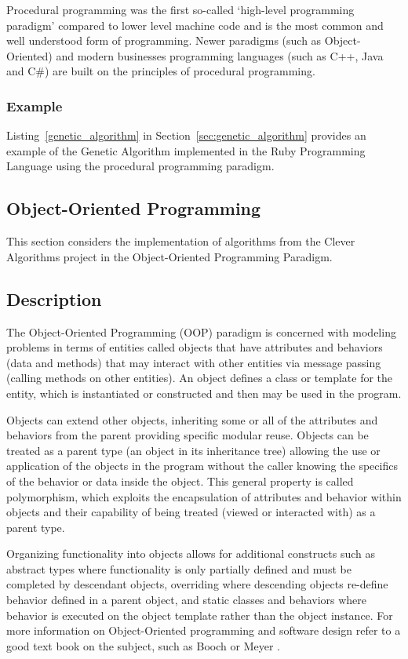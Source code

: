 Procedural programming was the first so-called `high-level programming paradigm' compared to lower level machine code and is the most common and well understood form of programming. Newer paradigms (such as Object-Oriented) and modern businesses programming languages (such as C++, Java and C\#) are built on the principles of procedural programming.

\subsubsection{Example}
Listing~\ref{genetic_algorithm} in Section~\ref{sec:genetic_algorithm} provides an example of the Genetic Algorithm implemented in the Ruby Programming Language using the procedural programming paradigm.


\subsection{Object-Oriented Programming}
\label{sec:oop}
This section considers the implementation of algorithms from the Clever Algorithms project in the Object-Oriented Programming Paradigm.

\subsection{Description}
The Object-Oriented Programming (OOP) paradigm is concerned with modeling problems in terms of entities called objects that have attributes and behaviors (data and methods) that may interact with other entities via message passing (calling methods on other entities). An object defines a class or template for the entity, which is instantiated or constructed and then may be used in the program.

Objects can extend other objects, inheriting some or all of the attributes and behaviors from the parent providing specific modular reuse. Objects can be treated as a parent type (an object in its inheritance tree) allowing the use or application of the objects in the program without the caller knowing the specifics of the behavior or data inside the object. This general property is called polymorphism, which exploits the encapsulation of attributes and behavior within objects and their capability of being treated (viewed or interacted with) as a parent type.

Organizing functionality into objects allows for additional constructs such as abstract types where functionality is only partially defined and must be completed by descendant objects, overriding where descending objects re-define behavior defined in a parent object, and static classes and behaviors where behavior is executed on the object template rather than the object instance. 
For more information on Object-Oriented programming and software design refer to a good text book on the subject, such as Booch \cite{Booch1997} or Meyer \cite{Meyer1997}.

